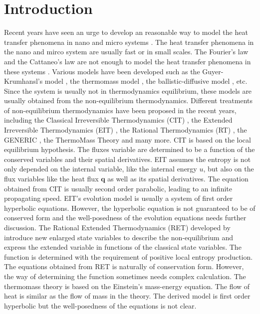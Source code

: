 \documentclass[a4paper]{article}
\begin{document}
\section{Introduction}
Recent years have seen an urge to develop an reasonable way to model the heat transfer phenomena in nano and micro systems \cite{chen2005nanoscale,tzou1996macro,wang2007heat,ding2006heat}. The heat transfer phenomena in the nano and mirco system are usually fast or in small scales. The Fourier's law and the Cattaneo's law are not enough to model the heat transfer phenomena in these systems \cite{chen2005nanoscale,Jou1996extended}. Various models have been developed such as the Guyer-Krumhansl's model \cite{guyer1966solution}, the thermomass model \cite{tzou2010nonlocal}, the ballistic-diffusive model \cite{chen2001ballistic,chen2002ballistic}, etc. Since the system is usually not in thermodynamics equilibrium, these models are usually obtained from the non-equilibrium thermodynamics. Different treatments of non-equilibrium thermodynamics have been proposed in the recent years, including the Classical Irreversible Thermodynamics (CIT) \cite{lebon2008classical}, the Extended Irreversible Thermodynamics (EIT) \cite{Jou1996extended}, the Rational Thermodynamics (RT) \cite{muller1998rational}, the GENERIC \cite{hans2005beyond}, the ThermoMass Theory \cite{zeng2006motion,dong2011generalized} and many more. CIT is based on the local equilibrium hypothesis. The fluxes variable are determined to be a function of the conserved variables and their spatial derivatives. EIT assumes the entropy is not only depended on the internal variable, like the internal energy $u$, but also on the flux variables like the heat flux $\mathbf{q}$ as well as its spatial derivatives. The equation obtained from CIT is usually second order parabolic, leading to an infinite propagating speed. EIT's evolution model is usually a system of first order hyperbolic equations. However, the hyperbolic equation is not guaranteed to be of conserved form and the well-posedness of the evolution equations needs further discussion\cite{Jou1996extended}. The Rational Extended Thermodynamics (RET) developed by \cite{needed} introduce new enlarged state variables to describe the non-equilibrium and express the extended variable in functions of the classical state variables. The function is determined with the requirement of positive local entropy production. The equations obtained from RET is naturally of conservation form. However, the way of determining the function sometimes needs complex calculation. The thermomass theory is based on the Einstein's mass-energy equation. The flow of heat is similar as the flow of mass in the theory. The derived model is first order hyperbolic but the well-posedness of the equations is not clear.%
\end{document}
